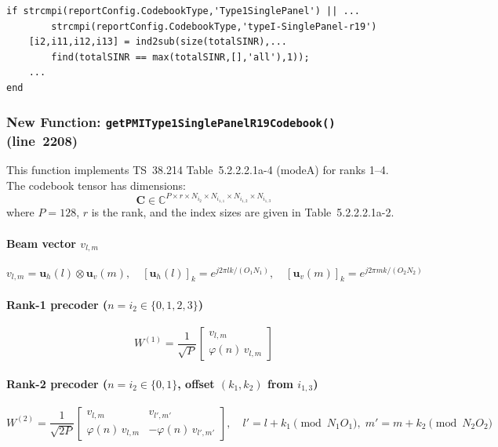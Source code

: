 \documentclass[11pt,a4paper]{article}
\begin{document}
\begin{lstlisting}
if strcmpi(reportConfig.CodebookType,'Type1SinglePanel') || ...
        strcmpi(reportConfig.CodebookType,'typeI-SinglePanel-r19')
    [i2,i11,i12,i13] = ind2sub(size(totalSINR),...
        find(totalSINR == max(totalSINR,[],'all'),1));
    ...
end
\end{lstlisting}

\subsubsection{New Function: \texttt{getPMIType1SinglePanelR19Codebook()} (line~2208)}

This function implements TS~38.214 Table~5.2.2.2.1a-4 (modeA) for ranks 1--4.
The codebook tensor has dimensions:
\begin{equation}
  \mathbf{C} \in \mathbb{C}^{P \times r \times N_{i_2} \times N_{i_{1,1}} \times N_{i_{1,2}} \times N_{i_{1,3}}}
\end{equation}
where $P=128$, $r$ is the rank, and the index sizes are given in
Table~5.2.2.2.1a-2.

\paragraph{Beam vector $v_{l,m}$}
\begin{equation}
  v_{l,m} = \mathbf{u}_h(l) \otimes \mathbf{u}_v(m), \quad
  [\mathbf{u}_h(l)]_k = e^{j2\pi l k / (O_1 N_1)}, \quad
  [\mathbf{u}_v(m)]_k = e^{j2\pi m k / (O_2 N_2)}
\end{equation}

\paragraph{Rank-1 precoder ($n = i_2 \in \{0,1,2,3\}$)}
\begin{equation}
  W^{(1)} = \frac{1}{\sqrt{P}}
  \begin{bmatrix} v_{l,m} \\ \varphi(n)\,v_{l,m} \end{bmatrix}
\end{equation}

\paragraph{Rank-2 precoder ($n = i_2 \in \{0,1\}$, offset $(k_1,k_2)$ from $i_{1,3}$)}
\begin{equation}
  W^{(2)} = \frac{1}{\sqrt{2P}}
  \begin{bmatrix}
    v_{l,m} & v_{l',m'} \\
    \varphi(n)\,v_{l,m} & -\varphi(n)\,v_{l',m'}
  \end{bmatrix}, \quad
  l' = l+k_1 \pmod{N_1 O_1}, \; m' = m+k_2 \pmod{N_2 O_2}
\end{equation}
\end{document}
